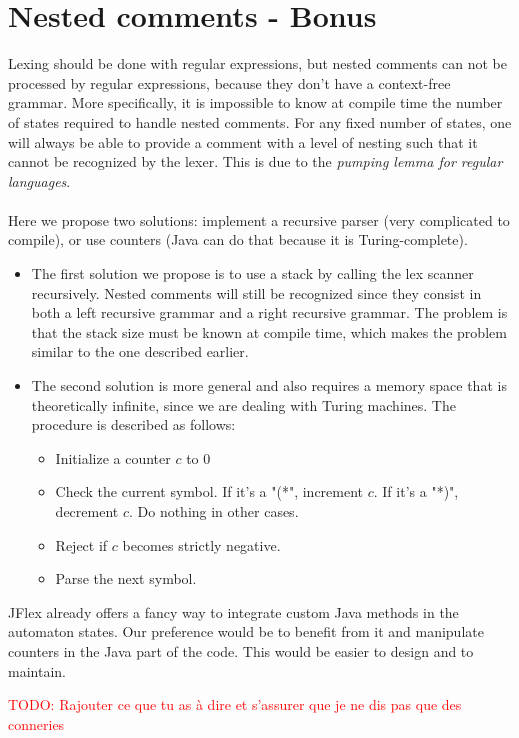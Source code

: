 \documentclass[12pt]{report}
\newcommand\todo[1]{\textcolor{red}{TODO: #1}}
\begin{document}
\chapter{Nested comments - Bonus}

Lexing should be done with regular expressions, but nested comments can not be processed by regular expressions, because they don't have
a context-free grammar. More specifically, it is impossible to know at compile time the number of states required to handle nested comments.
For any fixed number of states, one will always be able to provide a comment with a level of nesting such that it cannot be recognized by the lexer.
This is due to the \textit{pumping lemma for regular languages}. \\ \\
Here we propose two solutions: implement a recursive parser (very complicated to compile), or use counters (Java can do that because it is Turing-complete).
\begin{itemize}
\item The first solution we propose is to use a stack by calling the lex scanner recursively.
Nested comments will still be recognized since they consist in both a left recursive grammar and a right recursive grammar. The problem is that
the stack size must be known at compile time, which makes the problem similar to the one described earlier.
\item The second solution is more general and also requires a memory space that is theoretically infinite, since we are dealing with Turing machines.
The procedure is described as follows:
      \begin{itemize}
        \item{Initialize a counter $c$ to 0}
        \item{Check the current symbol. If it's a "(*", increment $c$. If it's a "*)", decrement $c$. Do nothing in other cases.}
        \item{Reject if $c$ becomes strictly negative.}
        \item{Parse the next symbol.}
      \end{itemize}
\end{itemize}
JFlex already offers a fancy way to integrate custom Java methods in the automaton states. Our preference would be to benefit from it and
manipulate counters in the Java part of the code. This would be easier to design and to maintain.

\todo{Rajouter ce que tu as à dire et s'assurer que je ne dis pas que des conneries}
\end{document}
